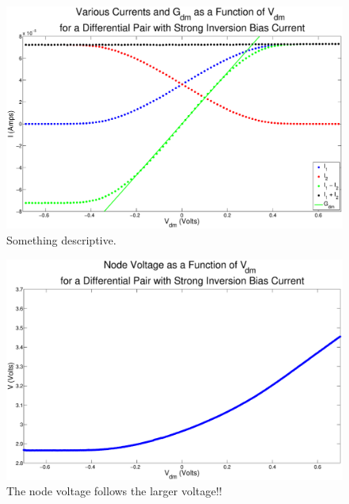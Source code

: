 \documentclass{article}
\begin{document}

\begin{figure}[H]
\centering
\includegraphics[width=\linewidth]{./Figures/AllCurrentsStrongInversion.eps}
\caption{Something descriptive. }
\label{fig:AllCurrentsStrongInversion }
\end{figure}


\begin{figure}[H]
\centering
\includegraphics[width=\linewidth]{./Figures/NodeVoltageStrongInversion.eps}
\caption{The node voltage follows the larger voltage!!}
\label{fig:nodevoltageSI}
\end{figure}
\end{document}
